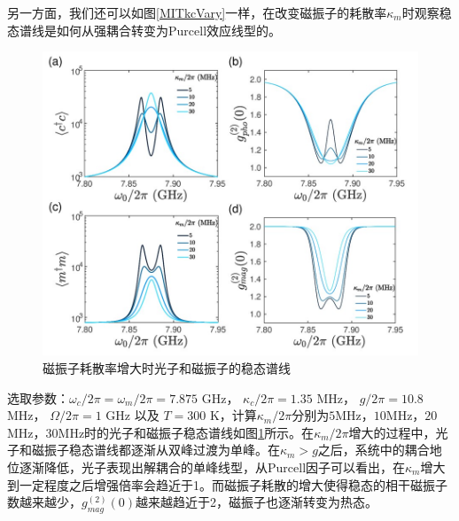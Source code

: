另一方面，我们还可以如图\ref{MITkcVary}一样，在改变磁振子的耗散率$\kappa_m$时观察稳态谱线是如何从强耦合转变为Purcell效应线型的。
\begin{figure}[htbp]
	\centering
	\includegraphics[width=1.9\basefigurewidth,clip]{./figure/4_7}
	\caption{磁振子耗散率增大时光子和磁振子的稳态谱线} 
	\label{PurcellKmVary}
\end{figure}
选取参数：$\omega_c/2\pi=\omega_m/2\pi=7.875$ GHz， $\kappa_c/2\pi=1.35$ MHz， $g/2\pi=10.8$ MHz， $\Omega/2\pi=1$ GHz 以及 $T=300$ K，计算$\kappa_m/2\pi$分别为$5$MHz，$10$MHz，$20$MHz，$30$MHz时的光子和磁振子稳态谱线如图\ref{PurcellKmVary}所示。在$\kappa_m/2\pi$增大的过程中，光子和磁振子稳态谱线都逐渐从双峰过渡为单峰。在$\kappa_m>g$之后，系统中的耦合地位逐渐降低，光子表现出解耦合的单峰线型，从Purcell因子可以看出，在$\kappa_m$增大到一定程度之后增强倍率会趋近于1。而磁振子耗散的增大使得稳态的相干磁振子数越来越少，$g_{mag}^{(2)}(0)$越来越趋近于2，磁振子也逐渐转变为热态。
